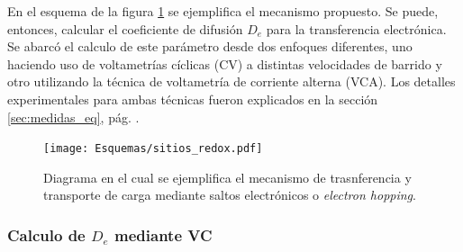 	    	 En el esquema de la figura \ref{fig:sitios_redox} se ejemplifica el mecanismo propuesto. Se puede, entonces, calcular el coeficiente de difusión $D_e$ para la transferencia electrónica. Se abarcó el calculo de este parámetro desde dos enfoques diferentes, uno haciendo uso de voltametrías cíclicas (CV) a distintas velocidades de barrido y otro utilizando la técnica de voltametría de corriente alterna (VCA). Los detalles experimentales para ambas técnicas fueron explicados en la sección \ref{sec:medidas_eq}, pág. \pageref{sec:medidas_eq}.
			\begin{figure}[ht!]
					\centering
			 	    \texttt{[image: Esquemas/sitios\_redox.pdf]}
			        \caption[Mecanismo de transferencia de electrones]{Diagrama en el cual se ejemplifica el mecanismo de trasnferencia y transporte de carga mediante saltos electrónicos o \textit{electron hopping}.}
			        \label{fig:sitios_redox}
			      	\end{figure} 

	 \subsubsection*{Calculo de $D_e$ mediante VC}	
	 
